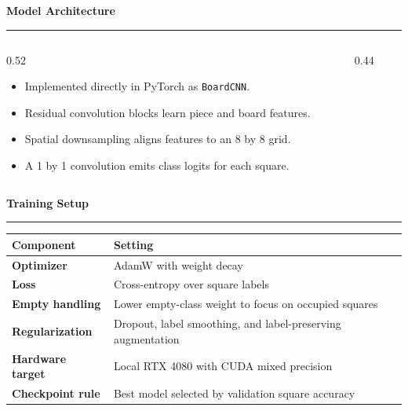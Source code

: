 \documentclass[aspectratio=169,10pt]{beamer}
\newcommand{\SlideTitle}[1]{%
  \vspace{0.2em}%
  {\titlefont\color{TitleBlack}\Large\bfseries #1}\par\vspace{0.35em}%
  {\color{Accent}\rule{0.16\paperwidth}{1.4pt}}\vspace{0.7em}%
}
\begin{document}
\begin{frame}
  \SlideTitle{Model Architecture}
  \begin{columns}[T,onlytextwidth]
    \begin{column}{0.52\textwidth}
      \begin{itemize}
        \item Implemented directly in PyTorch as \texttt{BoardCNN}.
        \item Residual convolution blocks learn piece and board features.
        \item Spatial downsampling aligns features to an 8 by 8 grid.
        \item A 1 by 1 convolution emits class logits for each square.
      \end{itemize}
    \end{column}
    \begin{column}{0.44\textwidth}
    \end{column}
  \end{columns}
\end{frame}

\begin{frame}
  \SlideTitle{Training Setup}
  \begin{tabularx}{\textwidth}{@{}>{\bfseries\color{TitleBlack}}lX@{}}
    \toprule
    Component & Setting \\
    \midrule
    Optimizer & AdamW with weight decay \\
    Loss & Cross-entropy over square labels \\
    Empty handling & Lower empty-class weight to focus on occupied squares \\
    Regularization & Dropout, label smoothing, and label-preserving augmentation \\
    Hardware target & Local RTX 4080 with CUDA mixed precision \\
    Checkpoint rule & Best model selected by validation square accuracy \\
    \bottomrule
  \end{tabularx}
\end{frame}
\end{document}
